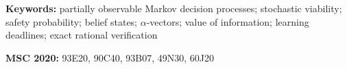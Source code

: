 \documentclass[11pt,a4paper]{article}
\theoremstyle{plain}
\theoremstyle{definition}
\theoremstyle{remark}
\begin{document}
\begin{abstract}
below $(4\varepsilon(1-\varepsilon))^{n/2}$ at a cost of one unit of floor margin per reading. A contamination operator interpolates exactly between the expected and worst-case readings at one stage, but not across stages, and admits a closed form on the delayed class. Every statement is regenerated from the definitions by a deterministic exact-arithmetic script; the support identity, the stabilization count and the rationality of the $\alpha$-vectors are additionally machine-checked in Lean~4.
\end{abstract}

\medskip
\noindent\textbf{Keywords:} partially observable Markov decision processes; stochastic viability; safety probability; belief states; $\alpha$-vectors; value of information; learning deadlines; exact rational verification

\medskip
\noindent\textbf{MSC 2020:} 93E20, 90C40, 93B07, 49N30, 60J20
\end{document}
